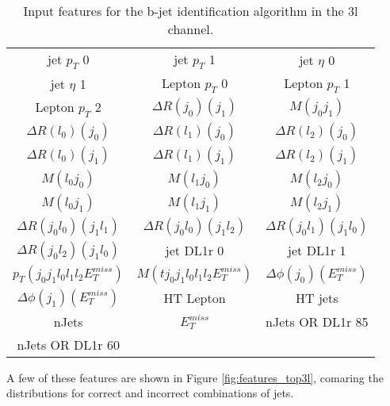 \begin{table}[H]
  \begin{center}
  \begin{tabular}{ccc}
  \hline\hline
    jet  $p_T$ 0 & jet  $p_T$ 1 & jet  $\eta$ 0 \\
    jet  $\eta$ 1 & Lepton  $p_T$ 0 & Lepton  $p_T$ 1 \\
    Lepton  $p_T$ 2 & $\Delta R(j_0)(j_1)$ & $M(j_0j_1)$ \\
    $\Delta R(l_0)(j_0)$ & $\Delta R(l_1)(j_0)$ & $\Delta R(l_2)(j_0)$ \\
    $\Delta R(l_0)(j_1)$ & $\Delta R(l_1)(j_1)$ & $\Delta R(l_2)(j_1)$ \\
    $M(l_0j_0)$ & $M(l_1j_0)$ & $M(l_2j_0)$ \\
    $M(l_0j_1)$ & $M(l_1j_1)$ & $M(l_2j_1)$ \\
    $\Delta R(j_0l_0)(j_1l_1)$ & $\Delta R(j_0l_0)(j_1l_2)$ & $\Delta R(j_0l_1)(j_1l_0)$ \\
    $\Delta R(j_0l_2)(j_1l_0)$ & jet DL1r 0 & jet DL1r 1 \\
     $p_T(j_0j_1l_0l_1l_2E_T^{miss})$ & $M(tj_0j_1l_0l_1l_2E_T^{miss})$ & $\Delta\phi(j_0)(E_T^{miss})$ \\
    $\Delta\phi(j_1)(E_T^{miss})$ & HT Lepton & HT jets \\
    nJets & $E_T^{miss}$ & nJets OR DL1r 85 \\
    nJets OR DL1r 60 & & \\
    \hline
  \end{tabular}
  \end{center}
  \caption{Input features for the b-jet identification algorithm in the 3l channel.}
  \label{tab:top3lfeatures}
\end{table}

A few of these features are shown in Figure \ref{fig:features_top3l}, comaring the distributions for correct and incorrect combinations of jets.

